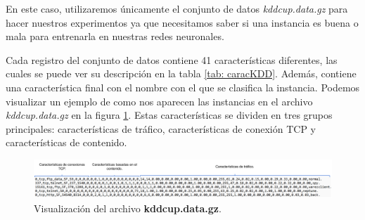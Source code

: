 En este caso, utilizaremos únicamente el conjunto de datos \textit{kddcup.data.gz} para hacer nuestros experimentos ya que necesitamos saber si una instancia es buena o mala para entrenarla en nuestras redes neuronales. 

Cada registro del conjunto de datos contiene 41 características diferentes, las cuales se puede ver su descripción en la tabla \ref{tab: caracKDD}. Además, contiene una característica final con el nombre con el que se clasifica la instancia. Podemos visualizar un ejemplo de como nos aparecen las instancias en el archivo \textit{kddcup.data.gz} en la figura \ref{img: kddpreview}. Estas características se dividen en tres grupos principales: características de tráfico, características de conexión TCP y características de contenido.
\begin{figure}[h]
    \begin{center}
    \includegraphics[width=\textwidth]{img/kddpreview.png}
    \end{center}
    \caption{Visualización del archivo \textbf{kddcup.data.gz}.}
    \label{img: kddpreview}
\end{figure}

\newpage


